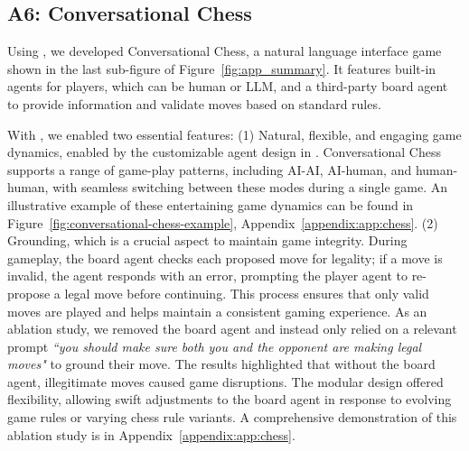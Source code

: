 
\subsection*{A6: Conversational Chess}

 
Using \libName, we developed Conversational Chess, a natural language interface game shown in the last sub-figure of Figure~\ref{fig:app_summary}.
 It features built-in agents for players, which can be human or LLM, and a third-party board agent to provide information and validate moves based on standard rules.

With \libName, we enabled two essential features: (1) Natural, flexible, and engaging game dynamics, enabled by the customizable agent design in \libName. Conversational Chess supports a range of game-play patterns, including AI-AI, AI-human, and human-human, with seamless switching between these modes during a single game. An illustrative example of these entertaining game dynamics can be found in Figure~\ref{fig:conversational-chess-example}, Appendix~\ref{appendix:app:chess}. (2) Grounding, which is a crucial aspect to maintain game integrity. During gameplay, the board agent checks each proposed move for legality; if a move is invalid, the agent responds with an error, prompting the player agent to re-propose a legal move before continuing. This process ensures that only valid moves are played and helps maintain a consistent gaming experience.
As an ablation study, we removed the board agent and instead only relied on a relevant prompt \textit{``you should make sure both you and the opponent are making
legal moves"} to ground their move. 
The results highlighted that without the board agent, illegitimate moves caused game disruptions. 
The modular design offered flexibility, allowing swift adjustments to the board agent in response to evolving game rules or varying chess rule variants. A comprehensive demonstration of this ablation study is in Appendix~\ref{appendix:app:chess}.


